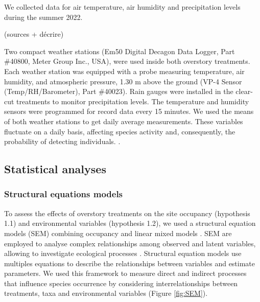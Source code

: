 We collected data for air temperature, air humidity and precipitation levels during the summer 2022.

(sources + décrire)

Two compact weather stations (Em50 Digital Decagon Data Logger, Part \#40800, Meter Group Inc., USA), were used inside both overstory treatments.
Each weather station was equipped with a probe measuring temperature, air humidity, and atmospheric pressure, 1.30 m above the ground (VP-4 Sensor (Temp/RH/Barometer), Part \#40023). 
Rain gauges were installed in the clear-cut treatments to monitor precipitation levels.
The temperature and humidity sensors were programmed for record data every 15 minutes. 
We used the means of both weather stations to get daily average measurements.
These variables fluctuate on a daily basis, affecting species activity and, consequently, the probability of detecting individuals. 
\citep{butterfieldCarabidLifeCycle1996,kotzeFortyYearsCarabid2011a,loveiEcologyBehaviorGround1996,odonnellPredictingVariationMicrohabitat2014a,spotilaRoleTemperatureWater1972}.

\subsection*{Statistical analyses}
\label{subsec:analyses}

\subsubsection{Structural equations models} 

To assess the effects of overstory treatments on the site occupancy (hypothesis 1.1) and environmental variables (hypothesis 1.2), we used a structural equation models (SEM) 
combining occupancy and linear mixed models \citep{graceSpecificationStructuralEquation2010,josephIntegratingOccupancyModels2016,mackenzieOccupancyEstimationModeling2006a}.
SEM are employed to analyse complex relationships among observed and latent variables, allowing to investigate ecological processes \citep{graceStructuralEquationModeling2008}.
Structural equation models use multiples equations to describe the relationships between variables and estimate parameters.
We used this framework to measure direct and indirect processes that influence species occurrence by considering interrelationships between treatments, taxa and environmental variables (Figure \ref*{fig:SEM}).

